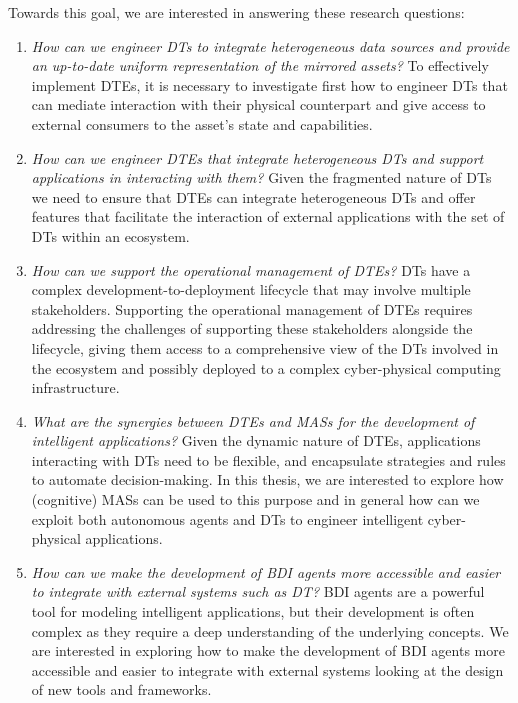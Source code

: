 Towards this goal, we are interested in answering these research questions:

\begin{enumerate}[label=\textbf{RQ\arabic*}]

  \item\label{rq:1}
  \emph{How can we engineer \acp{DT} to integrate heterogeneous data sources and provide an up-to-date uniform representation of the mirrored assets?}
  \newline
  To effectively implement \acp{DTE}, it is necessary to investigate first how to engineer \acp{DT} that can mediate interaction with their physical counterpart and give access to external consumers to the asset's state and capabilities.

  \item\label{rq:2}
  \emph{How can we engineer \acp{DTE} that integrate heterogeneous \acp{DT} and support applications in interacting with them?}
  \newline
  Given the fragmented nature of \acp{DT} we need to ensure that \acp{DTE} can integrate heterogeneous \acp{DT} and offer features that facilitate the interaction of external applications with the set of \acp{DT} within an ecosystem.

  \item\label{rq:3}
  \emph{How can we support the operational management of \acp{DTE}?}
  \newline
  \acp{DT} have a complex development-to-deployment lifecycle that may involve multiple stakeholders. Supporting the operational management of \acp{DTE} requires addressing the challenges of supporting these stakeholders alongside the lifecycle, giving them access to a comprehensive view of the \acp{DT} involved in the ecosystem and possibly deployed to a complex cyber-physical computing infrastructure.
  
  \item\label{rq:4}
  \emph{What are the synergies between \acp{DTE} and \acp{MAS} for the development of intelligent applications?}
  \newline
  Given the dynamic nature of \acp{DTE}, applications interacting with \acp{DT} need to be flexible, and encapsulate strategies and rules to automate decision-making. In this thesis, we are interested to explore how (cognitive) \acp{MAS} can be used to this purpose and in general how can we exploit both autonomous agents and \acp{DT} to engineer intelligent cyber-physical applications.  


  \item\label{rq:5}
  \emph{How can we make the development of \ac{BDI} agents more accessible and easier to integrate with external systems such as \ac{DT}?}
  \newline
  \ac{BDI} agents are a powerful tool for modeling intelligent applications, but their development is often complex as they require a deep understanding of the underlying concepts. We are interested in exploring how to make the development of \ac{BDI} agents more accessible and easier to integrate with external systems looking at the design of new tools and frameworks.
\end{enumerate}


